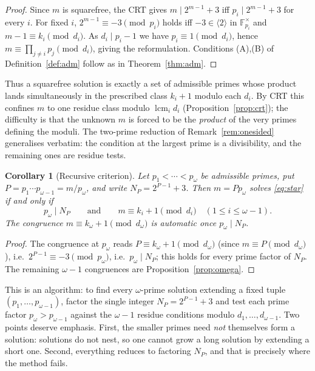 \documentclass[11pt,reqno]{amsart}
\theoremstyle{plain}
\newtheorem{corollary}{Corollary}
\theoremstyle{definition}
\theoremstyle{remark}
\newcommand{\F}{\mathbb{F}}
\DeclareMathOperator{\lcm}{lcm}
\newcommand{\gen}[1]{\langle #1 \rangle}
\begin{document}
\begin{proof}
Since $m$ is squarefree, the CRT gives $m\mid 2^{m-1}+3$ iff $p_{i}\mid 2^{m-1}+3$ for every
$i$. For fixed $i$, $2^{m-1}\equiv-3\pmod{p_{i}}$ holds iff $-3\in\gen{2}$ in $\F_{p_{i}}^{\times}$
and $m-1\equiv k_{i}\pmod{d_{i}}$. As $d_{i}\mid p_{i}-1$ we have $p_{i}\equiv 1\pmod{d_{i}}$,
hence $m\equiv\prod_{j\ne i}p_{j}\pmod{d_{i}}$, giving the reformulation. Conditions (A),(B) of
Definition~\ref{def:adm} follow as in Theorem~\ref{thm:adm}.
\end{proof}

Thus a squarefree solution is exactly a set of admissible primes whose product lands
simultaneously in the prescribed class $k_{i}+1$ modulo each $d_{i}$. By CRT this confines $m$ to
one residue class modulo $\lcm_{i}d_{i}$ (Proposition~\ref{prop:crt}); the difficulty is that the
unknown $m$ is forced to be the \emph{product} of the very primes defining the moduli. The
two-prime reduction of Remark~\ref{rem:onesided} generalises verbatim: the condition at the
largest prime is a divisibility, and the remaining ones are residue tests.

\begin{corollary}[Recursive criterion]\label{cor:omega}
Let $p_{1}<\cdots<p_{\omega}$ be admissible primes, put $P=p_{1}\cdots p_{\omega-1}=m/p_{\omega}$,
and write $N_{P}=2^{P-1}+3$. Then $m=Pp_{\omega}$ solves \eqref{eq:star} if and only if
\[
p_{\omega}\mid N_{P}\qquad\text{and}\qquad m\equiv k_{i}+1\pmod{d_{i}}\quad(1\le i\le\omega-1).
\]
The congruence $m\equiv k_{\omega}+1\pmod{d_{\omega}}$ is automatic once $p_{\omega}\mid N_{P}$.
\end{corollary}

\begin{proof}
The congruence at $p_{\omega}$ reads $P\equiv k_{\omega}+1\pmod{d_{\omega}}$ (since $m\equiv P
\pmod{d_{\omega}}$), i.e.\ $2^{P-1}\equiv-3\pmod{p_{\omega}}$, i.e.\ $p_{\omega}\mid N_{P}$; this
holds for every prime factor of $N_{P}$. The remaining $\omega-1$ congruences are
Proposition~\ref{prop:omega}.
\end{proof}

This is an algorithm: to find every $\omega$-prime solution extending a fixed tuple
$(p_{1},\dots,p_{\omega-1})$, factor the single integer $N_{P}=2^{P-1}+3$ and test each prime
factor $p_{\omega}>p_{\omega-1}$ against the $\omega-1$ residue conditions modulo
$d_{1},\dots,d_{\omega-1}$. Two points deserve emphasis. First, the smaller primes need
\emph{not} themselves form a solution: solutions do not nest, so one cannot grow a long solution
by extending a short one. Second, everything reduces to factoring $N_{P}$, and that is precisely
where the method fails.
\end{document}
